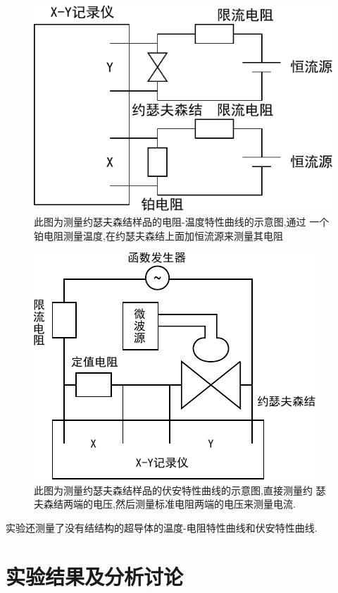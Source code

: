 \documentclass[aps,pre,12pt,preprint,onecolumn,showpacs,showkeys]{revtex4-1}
\begin{document}
\begin{figure}[Htbp]
\begin{center}
    \includegraphics[width=.7\textwidth]{graph1.pdf}
\end{center}
\caption{\label{fig:ins1}此图为测量约瑟夫森结样品的电阻-温度特性曲线的示意图,通过
一个铂电阻测量温度,在约瑟夫森结上面加恒流源来测量其电阻}
\end{figure}

\begin{figure}[Htbp]
\begin{center}
    \includegraphics[width=.7\textwidth]{graph2.pdf}
\end{center}
\caption{\label{fig:ins2}此图为测量约瑟夫森结样品的伏安特性曲线的示意图,直接测量约
    瑟夫森结两端的电压,然后测量标准电阻两端的电压来测量电流.}
\end{figure}

实验还测量了没有结结构的超导体的温度-电阻特性曲线和伏安特性曲线.

\section{实验结果及分析讨论}
\end{document}
